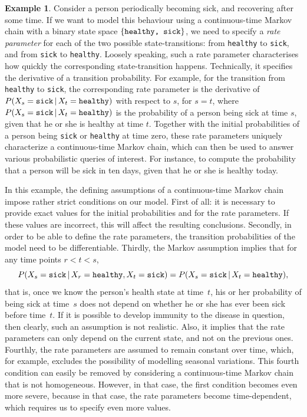 \documentclass[10pt,a4paper]{paper}
\theoremstyle{definition}
\newtheorem{exmp}{Example}%
\begin{document}
\begin{exmp}\label{ex:health_sick_exmp}
Consider a person periodically becoming sick, and recovering after some time. If we want to model this behaviour using a continuous-time Markov chain with a binary state space $\{\text{\tt healthy, sick}\}$, we need to specify a \emph{rate parameter} for each of the two possible state-transitions: from {\tt healthy} to {\tt sick}, and from {\tt sick} to {\tt healthy}. Loosely speaking, such a rate parameter characterises how quickly the corresponding state-transition happens. Technically, it specifies the derivative of a transition probability. For example, for the transition from {\tt healthy} to {\tt sick}, the corresponding rate parameter is the derivative of $P(X_s={\tt sick}\,\vert\,X_t={\tt healthy})$ with respect to $s$, for $s=t$, where $P(X_s={\tt sick}\,\vert\,X_t={\tt healthy})$ is the probability of a person being sick at time $s$, given that he or she is healthy at time $t$. Together with the initial probabilities of a person being {\tt sick} or {\tt healthy} at time zero, these rate parameters uniquely characterize a continuous-time Markov chain, which can then be used to answer various probabilistic queries of interest.
For instance, to compute the probability that a person will be sick in ten days, given that he or she is healthy today.

In this example, the defining assumptions of a continuous-time Markov chain impose rather strict conditions on our model. 
First of all: it is necessary to provide exact values for the initial probabilities and for the rate parameters. If these values are incorrect, this will affect the resulting conclusions.
Secondly, in order to be able to define the rate parameters, the transition probabilities of the model need to be differentiable.
Thirdly, the Markov assumption implies that for any time points $r<t<s$,
\begin{equation*}
P(X_s={\tt sick}\,\vert\, X_r={\tt healthy}, X_t={\tt sick}) = P(X_s={\tt sick}\,\vert\, X_t={\tt healthy}),
\end{equation*}
that is, once we know the person's health state at time~$t$, his or her probability of being sick at time~$s$ does not depend on whether he or she has ever been sick before time~$t$. If it is possible to develop immunity to the disease in question, then clearly, such an assumption is not realistic. Also, it implies that the rate parameters can only depend on the current state, and not on the previous ones.
Fourthly, the rate parameters are assumed to remain constant over time, which, for example, excludes the possibility of modelling seasonal variations.
This fourth condition can easily be removed by considering a continuous-time Markov chain that is not homogeneous. However, in that case, the first condition becomes even more severe, because in that case, the rate parameters become time-dependent, which requires us to specify even more values.


\end{exmp}
\end{document}
